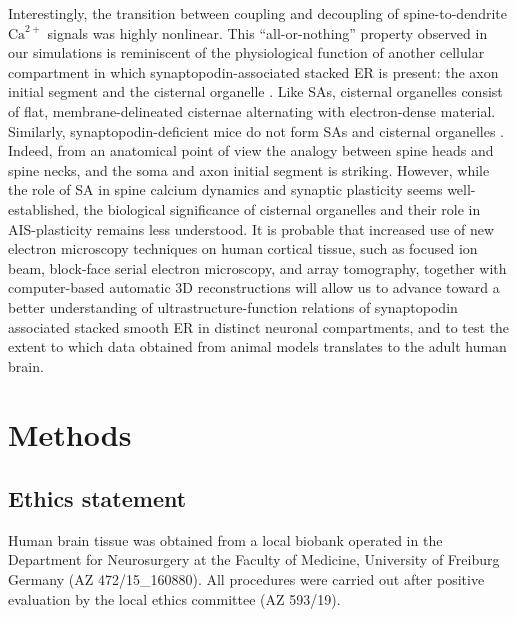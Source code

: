 \documentclass[12pt]{article}
\begin{document}
Interestingly, the transition between coupling and decoupling of spine-to-dendrite $\textrm{Ca}^{2+}$ signals was highly nonlinear. This “all-or-nothing” property observed in our simulations is reminiscent of the physiological function of another cellular compartment in which synaptopodin-associated stacked ER is present: the axon initial segment and the cisternal organelle \cite{Palay1968,Somogyu1976,Benedeczky1994,BasOrth2005,Rasband2010,SanchezPonce2011}. Like SAs, cisternal organelles consist of flat, membrane-delineated cisternae alternating with electron-dense material. Similarly, synaptopodin-deficient mice do not form SAs and cisternal organelles \cite{BasOrth2005}. Indeed, from an anatomical point of view the analogy between spine heads and spine necks, and the soma and axon initial segment is striking. However, while the role of SA in spine calcium dynamics and synaptic plasticity seems well-established, the biological significance of cisternal organelles and their role in AIS-plasticity \cite{Grubb2010,PanVazquez2020, Jamann2021} remains less understood. It is probable that increased use of new electron microscopy techniques on human cortical tissue, such as focused ion beam, block-face serial electron microscopy, and array tomography, together with computer-based automatic 3D reconstructions will allow us to advance toward a better understanding of ultrastructure-function relations of synaptopodin associated stacked smooth ER in distinct neuronal compartments, and to test the extent to which data obtained from animal models translates to the adult human brain. 

\section*{Methods}
\subsection*{Ethics statement} Human brain tissue was obtained from a local biobank operated in the Department for Neurosurgery at the Faculty of Medicine, University of Freiburg Germany (AZ 472/15\_160880). All procedures were carried out after positive evaluation by the local ethics committee (AZ 593/19).
\end{document}
